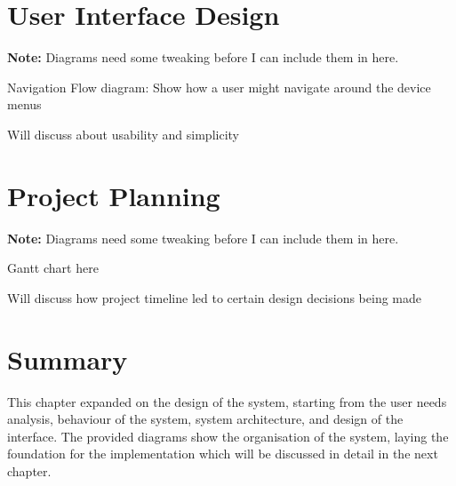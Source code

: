 \section{User Interface Design} %
\textbf{Note:} Diagrams need some tweaking before I can include them in here.

Navigation Flow diagram: Show how a user might navigate around the device menus

Will discuss about usability and simplicity

\section{Project Planning} %
\textbf{Note:} Diagrams need some tweaking before I can include them in here.

Gantt chart here

Will discuss how project timeline led to certain design decisions being made

\section{Summary} %
This chapter expanded on the design of the system, starting from the user needs analysis, behaviour of the system, system architecture, and design of the interface. The provided diagrams show the organisation of the system, laying the foundation for the implementation which will be discussed in detail in the next chapter.
